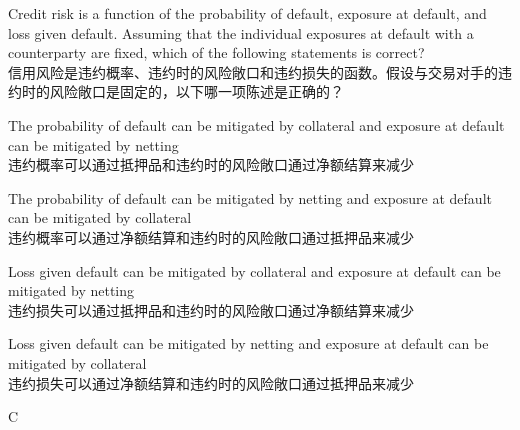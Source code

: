 \documentclass{article}
\newcounter{question} %
\begin{document}
\begin{question}
    Credit risk is a function of the probability of default, exposure at default, and loss given default. Assuming that the individual exposures at default with a counterparty are fixed, which of the following statements is correct?\\
    信用风险是违约概率、违约时的风险敞口和违约损失的函数。假设与交易对手的违约时的风险敞口是固定的，以下哪一项陈述是正确的？
\end{question}

\begin{choices}
    \item The probability of default can be mitigated by collateral and exposure at default can be mitigated by netting\\
    违约概率可以通过抵押品和违约时的风险敞口通过净额结算来减少
    \item The probability of default can be mitigated by netting and exposure at default can be mitigated by collateral\\
    违约概率可以通过净额结算和违约时的风险敞口通过抵押品来减少
    \item Loss given default can be mitigated by collateral and exposure at default can be mitigated by netting\\
    违约损失可以通过抵押品和违约时的风险敞口通过净额结算来减少
    \item Loss given default can be mitigated by netting and exposure at default can be mitigated by collateral\\
    违约损失可以通过净额结算和违约时的风险敞口通过抵押品来减少
\end{choices}

\begin{correctanswer}
    C
\end{correctanswer}
\end{document}

